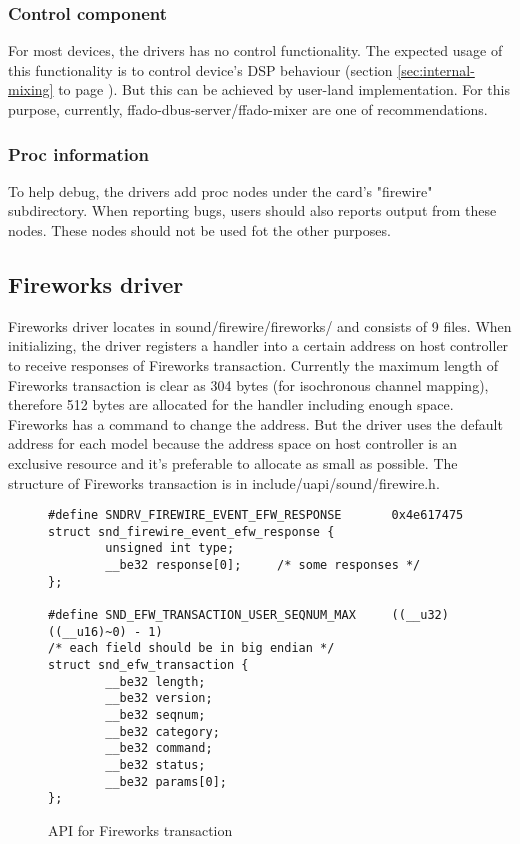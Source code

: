\documentclass[onecolumn]{article}
\begin{document}
\subsubsection{Control component}
For most devices, the drivers has no control functionality. The expected usage of this functionality is to control device's DSP behaviour (section \ref{sec:internal-mixing} to page \pageref{sec:internal-mixing}). But this can be achieved by user-land implementation. For this purpose, currently, ffado-dbus-server/ffado-mixer are one of recommendations.

\subsubsection{Proc information}

To help debug, the drivers add proc nodes under the card's "firewire" subdirectory. When reporting bugs, users should also reports output from these nodes. These nodes should not be used fot the other purposes.


\subsection{Fireworks driver}

Fireworks driver locates in sound/firewire/fireworks/ and consists of 9 files. When initializing, the driver registers a handler into a certain address on host controller to receive responses of Fireworks transaction. Currently the maximum length of Fireworks transaction is clear as 304 bytes (for isochronous channel mapping), therefore 512 bytes are allocated for the handler including enough space. Fireworks has a command to change the address. But the driver uses the default address for each model because the address space on host controller is an exclusive resource and it's preferable to allocate as small as possible. The structure of Fireworks transaction is in include/uapi/sound/firewire.h.

\begin{figure}[H]
\small
\begin{verbatim}
#define SNDRV_FIREWIRE_EVENT_EFW_RESPONSE       0x4e617475
struct snd_firewire_event_efw_response {
        unsigned int type;
        __be32 response[0];     /* some responses */
};

#define SND_EFW_TRANSACTION_USER_SEQNUM_MAX     ((__u32)((__u16)~0) - 1)
/* each field should be in big endian */
struct snd_efw_transaction {
        __be32 length;
        __be32 version;
        __be32 seqnum;
        __be32 category;
        __be32 command;
        __be32 status;
        __be32 params[0];
};
\end{verbatim}
\caption{API for Fireworks transaction}
\label{uapi-fireworks-transaction}
\end{figure}
\end{document}
